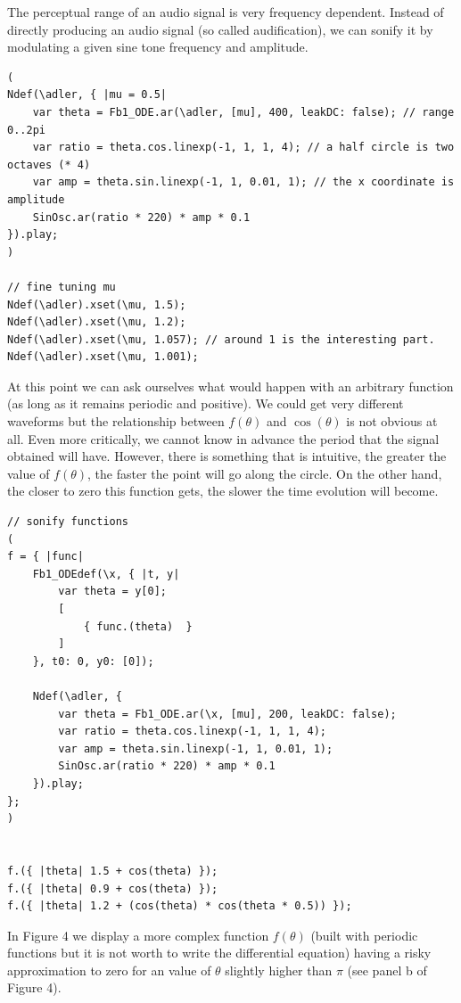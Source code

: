 \documentclass{article}
\begin{document}
The perceptual range of an audio signal is very frequency dependent. Instead of directly producing an audio signal (so called audification), we can sonify it by modulating a given sine tone frequency and amplitude.


\begin{lstlisting}[frame=single,caption=Sonifying the Adler equation as frequency and amplitude of a sine signal.]
(
Ndef(\adler, { |mu = 0.5|
	var theta = Fb1_ODE.ar(\adler, [mu], 400, leakDC: false); // range 0..2pi
	var ratio = theta.cos.linexp(-1, 1, 1, 4); // a half circle is two octaves (* 4)
	var amp = theta.sin.linexp(-1, 1, 0.01, 1); // the x coordinate is amplitude
	SinOsc.ar(ratio * 220) * amp * 0.1
}).play;
)

// fine tuning mu
Ndef(\adler).xset(\mu, 1.5);
Ndef(\adler).xset(\mu, 1.2);
Ndef(\adler).xset(\mu, 1.057); // around 1 is the interesting part.
Ndef(\adler).xset(\mu, 1.001);
\end{lstlisting}



At this point we can ask ourselves what would happen with an arbitrary function (as long as it remains periodic and positive). 
We could get very different waveforms but the relationship between $f(\theta)$ and $\cos(\theta)$ is not obvious at all. 
Even more critically, we cannot know in advance the period that the signal obtained will have. 
However, there is something that is intuitive, the greater the value of $f(\theta)$, the faster the point will go along the circle. 
On the other hand, the closer to zero this function gets, the slower the time evolution will become.

\begin{lstlisting}[frame=single,caption=Sound from an arbitrary periodic function by sonification as before.]
// sonify functions
(
f = { |func|
	Fb1_ODEdef(\x, { |t, y|
		var theta = y[0];
		[
			{ func.(theta)  }
		]
	}, t0: 0, y0: [0]);

	Ndef(\adler, {
		var theta = Fb1_ODE.ar(\x, [mu], 200, leakDC: false);
		var ratio = theta.cos.linexp(-1, 1, 1, 4);
		var amp = theta.sin.linexp(-1, 1, 0.01, 1);
		SinOsc.ar(ratio * 220) * amp * 0.1
	}).play;
};
)


f.({ |theta| 1.5 + cos(theta) });
f.({ |theta| 0.9 + cos(theta) });
f.({ |theta| 1.2 + (cos(theta) * cos(theta * 0.5)) });
\end{lstlisting}


In Figure 4 we display a more complex function $f(\theta)$ (built with periodic functions but it is not worth to write the differential equation) having a risky approximation to zero for an value of $\theta$ slightly higher than $\pi$ (see panel b of Figure 4).
\end{document}
